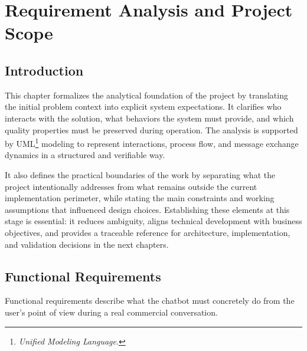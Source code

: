 \fancyhf{}
\setlength{\headheight}{14.49998pt}
\lhead{\textsl{\footnotesize{\nouppercase{\rightmark}}}}
\rhead{\textsl{\footnotesize{\nouppercase{\leftmark}}}}

\cfoot{\thepage}
\rfoot{\textsl{\footnotesize}}

\chapter{Requirement Analysis and Project Scope}

\section{Introduction}
This chapter formalizes the analytical foundation of the project by translating the initial problem context into explicit system expectations. It clarifies who interacts with the solution, what behaviors the system must provide, and which quality properties must be preserved during operation. The analysis is supported by UML\footnote{\textit{Unified Modeling Language}.} modeling to represent interactions, process flow, and message exchange dynamics in a structured and verifiable way.

It also defines the practical boundaries of the work by separating what the project intentionally addresses from what remains outside the current implementation perimeter, while stating the main constraints and working assumptions that influenced design choices. Establishing these elements at this stage is essential: it reduces ambiguity, aligns technical development with business objectives, and provides a traceable reference for architecture, implementation, and validation decisions in the next chapters.

\section{Functional Requirements}
Functional requirements describe what the chatbot must concretely do from the user's point of view during a real commercial conversation.

